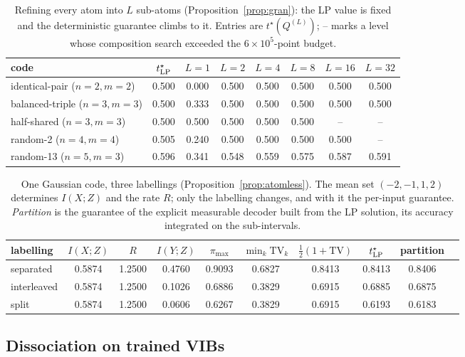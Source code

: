 \documentclass[11pt]{article}
\begin{document}
\begin{table}[t]\centering\small
\caption{Refining every atom into $L$ sub-atoms (Proposition~\ref{prop:gran}): the LP value is
fixed and the deterministic guarantee climbs to it. Entries are $t^\star(Q^{(L)})$; -- marks a
level whose composition search exceeded the $6\times10^{5}$-point budget.}
\label{tab:granularity}
\begin{tabular}{lccccccc}
\toprule
code & $t^\star_{\rm LP}$ & $L=1$ & $L=2$ & $L=4$ & $L=8$ & $L=16$ & $L=32$ \\
\midrule
identical-pair ($n=2,m=2$) & 0.500 & 0.000 & 0.500 & 0.500 & 0.500 & 0.500 & 0.500 \\
balanced-triple ($n=3,m=3$) & 0.500 & 0.333 & 0.500 & 0.500 & 0.500 & 0.500 & 0.500 \\
half-shared ($n=3,m=3$) & 0.500 & 0.500 & 0.500 & 0.500 & 0.500 & -- & -- \\
random-2 ($n=4,m=4$) & 0.505 & 0.240 & 0.500 & 0.500 & 0.500 & 0.500 & -- \\
random-13 ($n=5,m=3$) & 0.596 & 0.341 & 0.548 & 0.559 & 0.575 & 0.587 & 0.591 \\
\bottomrule
\end{tabular}
\end{table}
\begin{table}[t]\centering\small
\caption{One Gaussian code, three labellings (Proposition~\ref{prop:atomless}). The mean set
$(-2,-1,1,2)$ determines $I(X;Z)$ and the rate $R$; only the labelling changes, and with it the
per-input guarantee. \emph{Partition} is the guarantee of the explicit measurable decoder built
from the LP solution, its accuracy integrated on the sub-intervals.}
\label{tab:gausslab}
\begin{tabular}{lccccccccc}
\toprule
labelling & $I(X;Z)$ & $R$ & $I(Y;Z)$ & $\pi_{\max}$ & $\min_k\mathrm{TV}_k$ & $\tfrac12(1+\mathrm{TV})$ & $t^\star_{\rm LP}$ & partition \\
\midrule
separated & 0.5874 & 1.2500 & 0.4760 & 0.9093 & 0.6827 & 0.8413 & 0.8413 & 0.8406 \\
interleaved & 0.5874 & 1.2500 & 0.1026 & 0.6886 & 0.3829 & 0.6915 & 0.6885 & 0.6875 \\
split & 0.5874 & 1.2500 & 0.0606 & 0.6267 & 0.3829 & 0.6915 & 0.6193 & 0.6183 \\
\bottomrule
\end{tabular}
\end{table}

\subsection{Dissociation on trained VIBs}\label{sec:dissociation}
\end{document}
